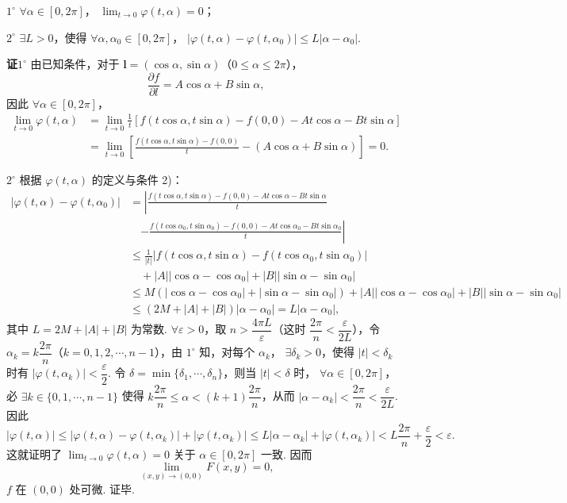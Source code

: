 \documentclass[UTF8, 12pt, fontset=fandol, oneside]{ctexart}
\begin{document}
$1^\circ$ $\forall\alpha\in[0,2\pi]$，
$\lim_{t\to0}\varphi(t,\alpha)=0$；

$2^\circ$ $\exists L>0$，使得 $\forall\alpha,\alpha_0\in[0,2\pi]$，
$|\varphi(t,\alpha)-\varphi(t,\alpha_0)|\le L|\alpha-\alpha_0|$.

\noindent\textbf{证}\quad $1^\circ$ 由已知条件，对于
$\mathbf l=(\cos\alpha,\sin\alpha)$（$0\le\alpha\le2\pi$），
\[
  \frac{\partial f}{\partial l}=A\cos\alpha+B\sin\alpha,
\]
因此 $\forall\alpha\in[0,2\pi]$，
\[
\begin{aligned}
  \lim_{t\to0}\varphi(t,\alpha)
  &=
  \lim_{t\to0}\frac1t
  [f(t\cos\alpha,t\sin\alpha)-f(0,0)-At\cos\alpha-Bt\sin\alpha]\\
  &=
  \lim_{t\to0}\left[
  \frac{f(t\cos\alpha,t\sin\alpha)-f(0,0)}{t}
  -(A\cos\alpha+B\sin\alpha)
  \right]=0.
\end{aligned}
\]

$2^\circ$ 根据 $\varphi(t,\alpha)$ 的定义与条件 2)：
\[
\begin{aligned}
|\varphi(t,\alpha)-\varphi(t,\alpha_0)|
&=
\left|
\frac{f(t\cos\alpha,t\sin\alpha)-f(0,0)-At\cos\alpha-Bt\sin\alpha}{t}
\right.\\
&\quad\left.
-
\frac{f(t\cos\alpha_0,t\sin\alpha_0)-f(0,0)-At\cos\alpha_0-Bt\sin\alpha_0}{t}
\right|\\
&\le
\frac1{|t|}
|f(t\cos\alpha,t\sin\alpha)-f(t\cos\alpha_0,t\sin\alpha_0)|\\
&\quad
 +|A||\cos\alpha-\cos\alpha_0|+|B||\sin\alpha-\sin\alpha_0|\\
&\le
M(|\cos\alpha-\cos\alpha_0|+|\sin\alpha-\sin\alpha_0|)
 +|A||\cos\alpha-\cos\alpha_0|+|B||\sin\alpha-\sin\alpha_0|\\
&\le (2M+|A|+|B|)|\alpha-\alpha_0|
=L|\alpha-\alpha_0|,
\end{aligned}
\]
其中 $L=2M+|A|+|B|$ 为常数. $\forall\varepsilon>0$，取
$n>\dfrac{4\pi L}{\varepsilon}$（这时 $\dfrac{2\pi}{n}<\dfrac{\varepsilon}{2L}$），令
$\alpha_k=k\dfrac{2\pi}{n}$（$k=0,1,2,\cdots,n-1$），由 $1^\circ$ 知，对每个 $\alpha_k$，
$\exists\delta_k>0$，使得 $|t|<\delta_k$ 时有
$|\varphi(t,\alpha_k)|<\dfrac\varepsilon2$. 令
$\delta=\min\{\delta_1,\cdots,\delta_n\}$，则当 $|t|<\delta$ 时，
$\forall\alpha\in[0,2\pi]$，必 $\exists k\in\{0,1,\cdots,n-1\}$ 使得
$k\dfrac{2\pi}{n}\le\alpha<(k+1)\dfrac{2\pi}{n}$，从而
$|\alpha-\alpha_k|<\dfrac{2\pi}{n}<\dfrac{\varepsilon}{2L}$. 因此
\[
  |\varphi(t,\alpha)|
  \le |\varphi(t,\alpha)-\varphi(t,\alpha_k)|+|\varphi(t,\alpha_k)|
  \le L|\alpha-\alpha_k|+|\varphi(t,\alpha_k)|
  <L\frac{2\pi}{n}+\frac\varepsilon2<\varepsilon.
\]
这就证明了 $\lim_{t\to0}\varphi(t,\alpha)=0$ 关于
$\alpha\in[0,2\pi]$ 一致. 因而
\[
  \lim_{(x,y)\to(0,0)}F(x,y)=0,
\]
$f$ 在 $(0,0)$ 处可微. 证毕.
\end{document}
